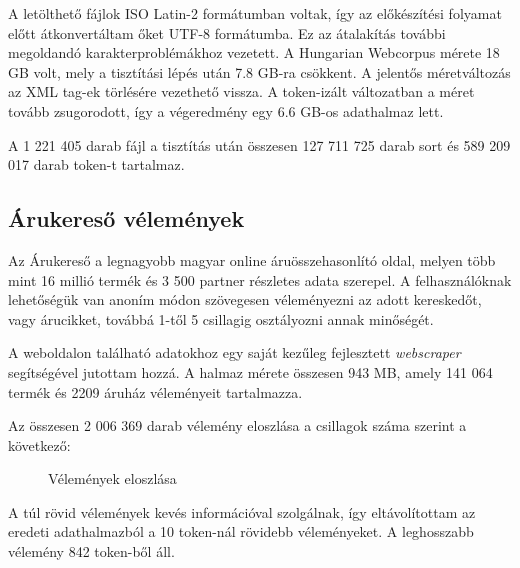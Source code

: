 A letölthető fájlok ISO Latin-2 formátumban voltak, így az előkészítési folyamat előtt átkonvertáltam őket UTF-8 formátumba. Ez az átalakítás további megoldandó karakterproblémákhoz vezetett. A Hungarian Webcorpus mérete 18 GB volt, mely a tisztítási lépés után 7.8 GB-ra csökkent. A jelentős méretváltozás az XML tag-ek törlésére vezethető vissza. A token-izált változatban a méret tovább zsugorodott, így a végeredmény egy 6.6 GB-os adathalmaz lett.

A 1 221 405 darab fájl a tisztítás után összesen 127 711 725 darab sort és 589 209 017 darab token-t tartalmaz.

\subsection{Árukereső vélemények}
Az Árukereső a legnagyobb magyar online áruösszehasonlító oldal, melyen több mint 16 millió termék és 3 500 partner részletes adata szerepel. A felhasználóknak lehetőségük van anoním módon szövegesen véleményezni az adott kereskedőt, vagy árucikket, továbbá 1-től 5 csillagig osztályozni annak minőségét.

A weboldalon található adatokhoz egy saját kezűleg fejlesztett \textit{webscraper} segítségével jutottam hozzá. A halmaz mérete összesen 943 MB, amely 141 064 termék és 2209 áruház véleményeit tartalmazza. 

Az összesen 2 006 369 darab vélemény eloszlása a csillagok száma szerint a következő:

\begin{figure}[H]
	\centering
	\hspace{5pt}
	\caption{Vélemények eloszlása}
	\label{fig:example-2}
\end{figure}

A túl rövid vélemények kevés információval szolgálnak, így eltávolítottam az eredeti adathalmazból a 10 token-nál rövidebb véleményeket. A leghosszabb vélemény 842 token-ből áll.